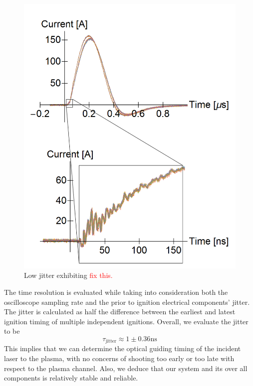 \documentclass[../main.tex]{subfiles}
\begin{document}
\begin{figure}
    \centering
    \includegraphics[width=\textwidth]{figures/jitter/low_jitter.png}
    \caption{Low jitter exhibiting \textcolor{red}{fix this.}}
    \label{fig:low_jitter}
\end{figure}

The time resolution is evaluated while taking into consideration both the oscilloscope sampling rate and the prior to ignition electrical components' jitter. The jitter is calculated as half the difference between the earliest and latest ignition timing of multiple independent ignitions. Overall, we evaluate the jitter to be
\begin{equation}
	\tau_\text{jitter}\approx 1\pm 0.36\si{\ns}
\end{equation}
This implies that we can determine the optical guiding timing of the incident laser to the plasma, with no concerns of shooting too early or too late with respect to the plasma channel. Also, we deduce that our system and its over all components is relatively stable and reliable.
\end{document}
